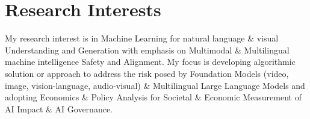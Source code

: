 
\section*{Research Interests}

My research interest is in Machine Learning for natural language \& visual Understanding and Generation with emphasis on Multimodal \& Multilingual machine intelligence Safety and Alignment. My focus is developing algorithmic solution or approach to address the risk posed by Foundation Models (video, image, vision-language, audio-visual) \& Multilingual Large Language Models and adopting Economics \& Policy Analysis for Societal \& Economic Measurement of AI Impact \& AI Governance. 